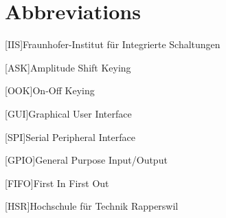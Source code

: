 \chapter*{Abbreviations}

\begin{acronym}
	[IIS]{Fraunhofer-Institut für Integrierte Schaltungen}
\end{acronym}

\begin{acronym}
	[ASK]{Amplitude Shift Keying}
\end{acronym}

\begin{acronym}
	[OOK]{On-Off Keying}
\end{acronym}

\begin{acronym}
	[GUI]{Graphical User Interface}
\end{acronym}

\begin{acronym}
	[SPI]{Serial Peripheral Interface}
\end{acronym}

\begin{acronym}
	[GPIO]{General Purpose Input/Output}
\end{acronym}

\begin{acronym}
	[FIFO]{First In First Out}
\end{acronym}

\begin{acronym}
	[HSR]{Hochschule für Technik Rapperswil}
\end{acronym}